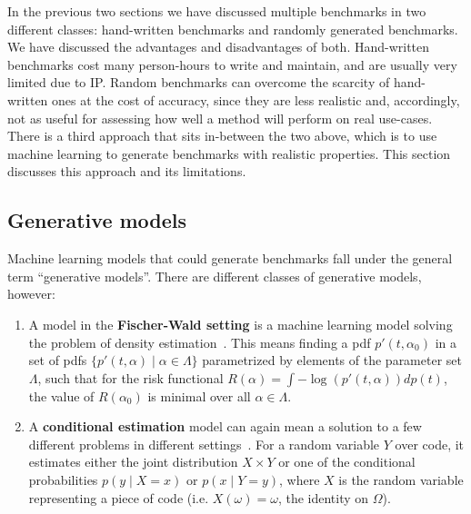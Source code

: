 In the previous two sections we have discussed multiple benchmarks in two different classes: hand-written benchmarks and randomly generated benchmarks.
We have discussed the advantages and disadvantages of both.
Hand-written benchmarks cost many person-hours to write and maintain, and are usually very limited due to \ac{IP}.
Random benchmarks can overcome the scarcity of hand-written ones at the cost of accuracy, since they are less realistic and, accordingly, not as useful for assessing how well a method will perform on real use-cases.
There is a third approach that sits in-between the two above, which is to use machine learning to generate benchmarks with realistic properties.
This section discusses this approach and its limitations.

\subsection{Generative models}
\label{sec:generative}

Machine learning models that could generate benchmarks fall under the general term ``generative models''.
There are different classes of generative models, however:
\begin{enumerate}
\item \label{fischer-wald} A model in the \textbf{Fischer-Wald setting} is a machine learning model solving the problem of density estimation~\cite{vapnik}. This means finding a \ac{pdf} $p'(t,\alpha_0)$ in a set of \acp{pdf} $\{ p'(t,\alpha) \mid \alpha \in \Lambda \}$ parametrized by elements of the parameter set $\Lambda$,
  such that for the risk functional $R(\alpha) = \int -\log(p'(t,\alpha)) dp(t)$, the value of $R(\alpha_0)$ is minimal over all $\alpha \in \Lambda$.
\item \label{conditional-estimation} A \textbf{conditional estimation} model can again mean a solution to a few different problems in different settings~\cite{vapnik}. For a random variable $Y$ over code, it estimates either the joint distribution $X \times Y$ or one of the conditional probabilities $p(y \mid X = x)$ or $p(x \mid Y = y)$, where $X$ is the random variable representing a piece of code (i.e. $X(\omega) = \omega$, the identity on $\Omega$).

\end{enumerate}

